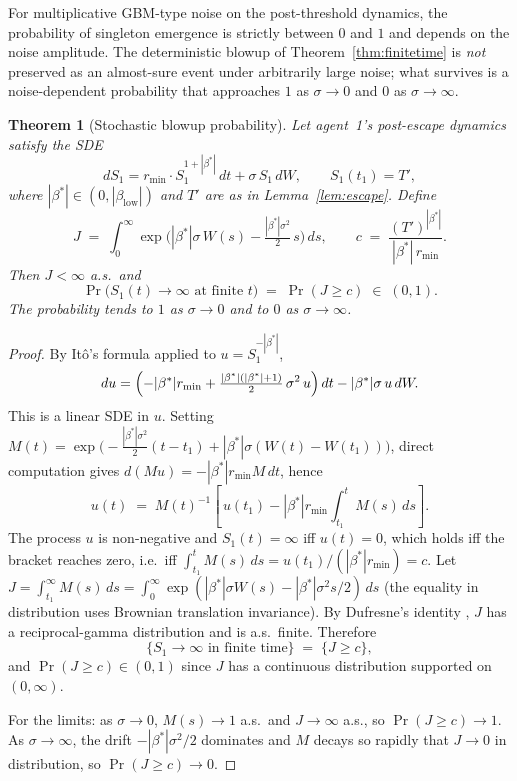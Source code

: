 \documentclass[11pt,letterpaper]{article}
\theoremstyle{plain}
\newtheorem{theorem}{Theorem}[section]
\theoremstyle{definition}
\theoremstyle{remark}
\newcommand{\betaL}{\beta_{\mathrm{low}}}
\newcommand{\rmin}{r_{\min}}
\begin{document}
For multiplicative GBM-type noise on the post-threshold dynamics, the
probability of singleton emergence is strictly between $0$ and $1$ and
depends on the noise amplitude.
The deterministic blowup of Theorem~\ref{thm:finitetime} is \emph{not}
preserved as an almost-sure event under arbitrarily large noise; what
survives is a noise-dependent probability that approaches $1$ as
$\sigma \to 0$ and $0$ as $\sigma \to \infty$.

\begin{theorem}[Stochastic blowup probability]
\label{thm:stochastic}
Let agent~1's post-escape dynamics satisfy the SDE
\begin{equation}
  dS_1 = \rmin \cdot S_1^{1+|\beta^*|}\, dt + \sigma\, S_1\, dW,
  \qquad S_1(t_1) = T',
  \label{eq:sde}
\end{equation}
where $|\beta^*| \in (0, |\betaL|)$ and $T'$ are as in
Lemma~\ref{lem:escape}.
Define
\[
  J \;=\; \int_{0}^{\infty}
    \exp\!\bigl(|\beta^*|\sigma\, W(s)
                - \tfrac{|\beta^*|\sigma^{2}}{2}\, s\bigr)\, ds,
  \qquad
  c \;=\; \frac{(T')^{|\beta^*|}}{|\beta^*|\,\rmin}.
\]
Then $J < \infty$ a.s.\ and
\[
  \Pr\bigl(S_1(t) \to \infty \text{ at finite } t\bigr)
  \;=\; \Pr(J \geq c) \;\in\; (0, 1).
\]
The probability tends to $1$ as $\sigma \to 0$ and to $0$ as
$\sigma \to \infty$.
\end{theorem}

\begin{proof}
By It\^{o}'s formula applied to $u = S_1^{-|\beta^*|}$,
\[
  du = \Bigl(-|\beta^*|\rmin
            + \tfrac{|\beta^*|(|\beta^*|+1)}{2}\,\sigma^2\,u\Bigr)\,dt
     - |\beta^*|\sigma\,u\,dW.
\]
This is a linear SDE in $u$.
Setting
$M(t) = \exp\!\bigl(-\tfrac{|\beta^*|\sigma^2}{2}(t-t_1)
                    + |\beta^*|\sigma(W(t)-W(t_1))\bigr)$,
direct computation gives $d(M u) = -|\beta^*|\rmin M\, dt$, hence
\[
  u(t) \;=\; M(t)^{-1}\!\left[\,u(t_1)
                              - |\beta^*|\rmin \int_{t_1}^{t} M(s)\,ds\right].
\]
The process $u$ is non-negative and $S_1(t) = \infty$ iff $u(t) = 0$,
which holds iff the bracket reaches zero, i.e.\ iff
$\int_{t_1}^{t} M(s)\,ds = u(t_1)/(|\beta^*|\rmin) = c$.
Let
$J = \int_{t_1}^{\infty} M(s)\,ds
   = \int_0^\infty \exp(|\beta^*|\sigma W(s) - |\beta^*|\sigma^2 s/2)\,ds$
(the equality in distribution uses Brownian translation invariance).
By Dufresne's identity \citep{dufresne1990distribution}, $J$ has a
reciprocal-gamma distribution and is a.s.\ finite.
Therefore
\[
  \{S_1 \to \infty \text{ in finite time}\} \;=\; \{J \geq c\},
\]
and $\Pr(J \geq c) \in (0,1)$ since $J$ has a continuous distribution
supported on $(0,\infty)$.

For the limits: as $\sigma \to 0$, $M(s) \to 1$ a.s.\ and $J \to \infty$
a.s., so $\Pr(J \geq c) \to 1$.
As $\sigma \to \infty$, the drift $-|\beta^*|\sigma^2/2$ dominates and
$M$ decays so rapidly that $J \to 0$ in distribution, so
$\Pr(J \geq c) \to 0$.
\end{proof}
\end{document}
